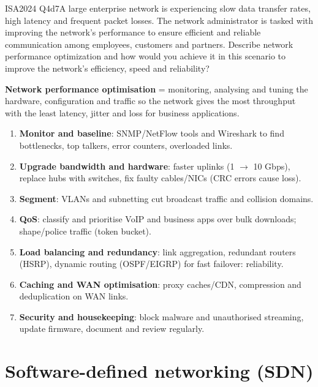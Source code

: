 \documentclass[10pt]{article}
\begin{document}
\begin{pastq}{ISA2024 Q4d}{7}A large enterprise network is experiencing slow data transfer rates, high latency and frequent packet losses. The network administrator is tasked with improving the network's performance to ensure efficient and reliable communication among employees, customers and partners. Describe network performance optimization and how would you achieve it in this scenario to improve the network's efficiency, speed and reliability?\end{pastq}
\begin{ans}
\textbf{Network performance optimisation} = monitoring, analysing and tuning the hardware, configuration and traffic so the network gives the most throughput with the least latency, jitter and loss for business applications.
\begin{enumerate}
\item \textbf{Monitor and baseline}: SNMP/NetFlow tools and Wireshark to find bottlenecks, top talkers, error counters, overloaded links.
\item \textbf{Upgrade bandwidth and hardware}: faster uplinks (1 $\to$ 10 Gbps), replace hubs with switches, fix faulty cables/NICs (CRC errors cause loss).
\item \textbf{Segment}: VLANs and subnetting cut broadcast traffic and collision domains.
\item \textbf{QoS}: classify and prioritise VoIP and business apps over bulk downloads; shape/police traffic (token bucket).
\item \textbf{Load balancing and redundancy}: link aggregation, redundant routers (HSRP), dynamic routing (OSPF/EIGRP) for fast failover: reliability.
\item \textbf{Caching and WAN optimisation}: proxy caches/CDN, compression and deduplication on WAN links.
\item \textbf{Security and housekeeping}: block malware and unauthorised streaming, update firmware, document and review regularly.
\end{enumerate}
\end{ans}

\Needspace{9cm}
\section{Software-defined networking (SDN)}
\end{document}
